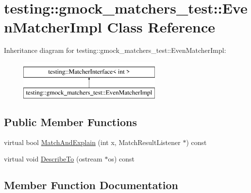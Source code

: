 \hypertarget{classtesting_1_1gmock__matchers__test_1_1EvenMatcherImpl}{}\section{testing\+::gmock\+\_\+matchers\+\_\+test\+::Even\+Matcher\+Impl Class Reference}
\label{classtesting_1_1gmock__matchers__test_1_1EvenMatcherImpl}
Inheritance diagram for testing\+::gmock\+\_\+matchers\+\_\+test\+::Even\+Matcher\+Impl\+:\begin{figure}[H]
\begin{center}
\leavevmode
\includegraphics[height=2.000000cm]{classtesting_1_1gmock__matchers__test_1_1EvenMatcherImpl}
\end{center}
\end{figure}
\subsection*{Public Member Functions}
\begin{DoxyCompactItemize}
\item 
virtual bool \mbox{\hyperlink{classtesting_1_1gmock__matchers__test_1_1EvenMatcherImpl_a0ca990403daf3856cda897e4b1a02ae4}{Match\+And\+Explain}} (int x, Match\+Result\+Listener $\ast$) const
\item 
virtual void \mbox{\hyperlink{classtesting_1_1gmock__matchers__test_1_1EvenMatcherImpl_ae72d37964b4004dfa3a04d7b529ad2f9}{Describe\+To}} (ostream $\ast$os) const
\end{DoxyCompactItemize}


\subsection{Member Function Documentation}
\mbox{\label{classtesting_1_1gmock__matchers__test_1_1EvenMatcherImpl_ae72d37964b4004dfa3a04d7b529ad2f9}} 
